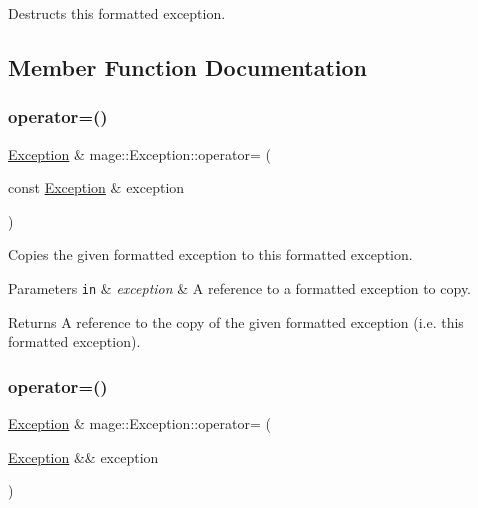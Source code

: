 Destructs this formatted exception. 

\subsection{Member Function Documentation}
\hypertarget{classmage_1_1_exception_ab0e7e6b32b07505271a4a88067ab54f4}{}\label{classmage_1_1_exception_ab0e7e6b32b07505271a4a88067ab54f4} 
\subsubsection{\texorpdfstring{operator=()}{operator=()}\hspace{0.1cm}{\footnotesize\ttfamily [1/2]}}
{\footnotesize\ttfamily \hyperlink{classmage_1_1_exception}{Exception} \& mage\+::\+Exception\+::operator= (\begin{DoxyParamCaption}\item[{const \hyperlink{classmage_1_1_exception}{Exception} \&}]{exception }\end{DoxyParamCaption})\hspace{0.3cm}{\ttfamily [default]}}

Copies the given formatted exception to this formatted exception.


\begin{DoxyParams}[1]{Parameters}
\mbox{\tt in}  & {\em exception} & A reference to a formatted exception to copy. \\
\hline
\end{DoxyParams}
\begin{DoxyReturn}{Returns}
A reference to the copy of the given formatted exception (i.\+e. this formatted exception). 
\end{DoxyReturn}
\hypertarget{classmage_1_1_exception_aa9305c6bd8836f56ffa970473533f031}{}\label{classmage_1_1_exception_aa9305c6bd8836f56ffa970473533f031} 
\subsubsection{\texorpdfstring{operator=()}{operator=()}\hspace{0.1cm}{\footnotesize\ttfamily [2/2]}}
{\footnotesize\ttfamily \hyperlink{classmage_1_1_exception}{Exception} \& mage\+::\+Exception\+::operator= (\begin{DoxyParamCaption}\item[{\hyperlink{classmage_1_1_exception}{Exception} \&\&}]{exception }\end{DoxyParamCaption})\hspace{0.3cm}{\ttfamily [default]}}

